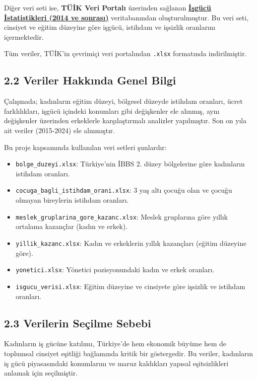 \documentclass[
  11pt,
  a4paper,
  DIV=11,
  numbers=noendperiod]{scrartcl}
\providecommand{\tightlist}{%
  \setlength{\itemsep}{0pt}\setlength{\parskip}{0pt}}\usepackage{longtable,booktabs,array}
\begin{document}
Diğer veri seti ise, \textbf{TÜİK Veri Portalı} üzerinden sağlanan
\href{https://data.tuik.gov.tr/Search/Search?text=i\%C5\%9Fg\%C3\%BCc\%C3\%BC}{\textbf{İşgücü
İstatistikleri (2014 ve sonrası)}} veritabanından oluşturulmuştur. Bu
veri seti, cinsiyet ve eğitim düzeyine göre işgücü, istihdam ve işsizlik
oranlarını içermektedir.

Tüm veriler, TÜİK'in çevrimiçi veri portalından \texttt{.xlsx}
formatında indirilmiştir.

\subsection{2.2 Veriler Hakkında Genel
Bilgi}\label{veriler-hakkux131nda-genel-bilgi}

Çalışmada; kadınların eğitim düzeyi, bölgesel düzeyde istihdam oranları,
ücret farklılıkları, işgücü içindeki konumları gibi değişkenler ele
alınmış, aynı değişkenler üzerinden erkeklerle karşılaştırmalı analizler
yapılmıştır. Son on yıla ait veriler (2015-2024) ele alınmıştır.

Bu proje kapsamında kullanılan veri setleri şunlardır:

\begin{itemize}
\tightlist
\item
  \texttt{bolge\_duzeyi.xlsx}: Türkiye'nin İBBS 2. düzey bölgelerine
  göre kadınların istihdam oranları.
\item
  \texttt{cocuga\_bagli\_istihdam\_orani.xlsx}: 3 yaş altı çocuğu olan
  ve çocuğu olmayan bireylerin istihdam oranları.
\item
  \texttt{meslek\_gruplarina\_gore\_kazanc.xlsx}: Meslek gruplarına göre
  yıllık ortalama kazançlar (kadın ve erkek).
\item
  \texttt{yillik\_kazanc.xlsx}: Kadın ve erkeklerin yıllık kazançları
  (eğitim düzeyine göre).
\item
  \texttt{yonetici.xlsx}: Yönetici pozisyonundaki kadın ve erkek
  oranları.
\item
  \texttt{isgucu\_verisi.xlsx}: Eğitim düzeyine ve cinsiyete göre
  işsizlik ve istihdam oranları.
\end{itemize}

\subsection{2.3 Verilerin Seçilme
Sebebi}\label{verilerin-seuxe7ilme-sebebi}

Kadınların iş gücüne katılımı, Türkiye'de hem ekonomik büyüme hem de
toplumsal cinsiyet eşitliği bağlamında kritik bir göstergedir. Bu
veriler, kadınların iş gücü piyasasındaki konumlarını ve maruz
kaldıkları yapısal eşitsizlikleri anlamak için seçilmiştir.
\end{document}
